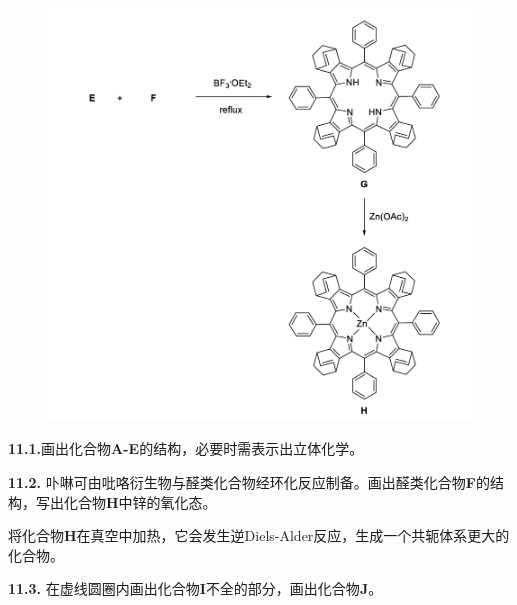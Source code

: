 \begin{figure}[h!]
	\centering
	\includegraphics[width=12cm]{./pic/t11-2.pdf}
\end{figure}

\noindent\textbf{11.1.}画出化合物\textbf{A-E}的结构，必要时需表示出立体化学。

\noindent\textbf{11.2.}
卟啉可由吡咯衍生物与醛类化合物经环化反应制备。画出醛类化合物\textbf{F}的结构，写出化合物\textbf{H}中锌的氧化态。

将化合物\textbf{H}在真空中加热，它会发生逆Diels-Alder反应，生成一个共轭体系更大的化合物。

\noindent\textbf{11.3.} 在虚线圆圈内画出化合物\textbf{I}不全的部分，画出化合物\textbf{J}。

